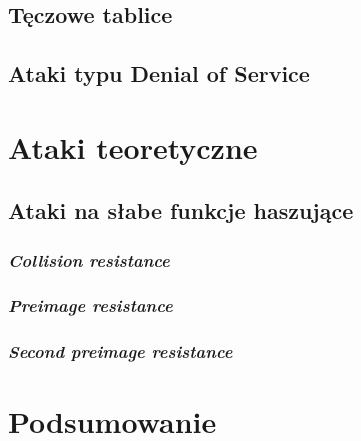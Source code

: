 \documentclass[12pt,a4paper,twoside]{article}
\begin{document}
\subsection{Tęczowe tablice}

\subsection{Ataki typu Denial of Service}

\section{Ataki teoretyczne}

\subsection{Ataki na słabe funkcje haszujące}

\subsubsection{\textit{Collision resistance}}

\subsubsection{\textit{Preimage resistance}}

\subsubsection{\textit{Second preimage resistance}}

\section{Podsumowanie}
\end{document}
